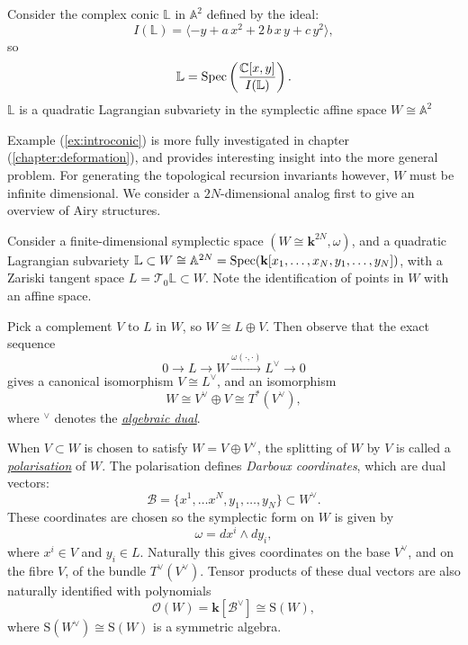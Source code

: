     
    
    \begin{ex} 
    \label{ex:introconic}
    Consider the complex conic \( \mathbb{L}\) in \( \mathbb{A}^2\) defined by the ideal:
    \[I(\mathbb{L})=\langle-y+a\,x^2+2\,b\,x\,y+c\,y^2\rangle,\]
    so
    \[ \mathbb{L}  = \mathrm{Spec}\left( \frac{\mathbb{C}[x,y]}{I(\mathbb{L})} \right).\] 
    \(\mathbb{L}\) is a quadratic Lagrangian subvariety in the symplectic affine space \(W \cong \mathbb{A}^2 \)
    \end{ex} 
    
    
    Example (\ref{ex:introconic}) is more fully investigated in chapter (\ref{chapter:deformation}), and provides interesting insight into the more general problem. For generating the topological recursion invariants however, \(W\) must be infinite dimensional. We consider a \(2N\)-dimensional analog first to give an overview of Airy structures.
    
    Consider a finite-dimensional symplectic space \((W\cong \mathbf{k}^{2N}, \omega ) \), and a quadratic Lagrangian subvariety \(\mathbb{L} \subset W \cong \mathbb{A}^{2N} = \mathrm{Spec}( \mathbf{k}[x_1, \dots ,x_N, y_1, \dots, y_N])\), with a Zariski tangent space \( L=\mathcal{T}_0\mathbb{L} \subset W \).  Note the identification of points in \(W\) with an affine space.
    
    Pick a complement \(V\) to \(L\) in \(W\), so
    \(W \cong L\oplus V.\)
    Then observe that the exact sequence 
    \[0 \rightarrow L\to W\stackrel{\omega(\cdot,\cdot)}{\to} L^{\vee} \rightarrow 0 \] 
    gives a canonical isomorphism \(V\cong L^{\vee}\), and an isomorphism 
    \[ W\cong V^{\vee}\oplus V \cong T^{*}(V^{\vee} ),\] 
    where \( {}^{\vee} \) denotes the \emph{\hyperref[defn:algdual]{algebraic dual}}. 
    
    When \(V\subset W\)  is chosen to satisfy \(W = V \oplus V^{\vee}\), the splitting of \(W\) by \(V\) is called a \emph{\hyperref[defn:polarisation]{polarisation}} of \(W\).  The polarisation defines \emph{Darboux coordinates}, which are dual vectors: 
    \[ \mathcal{B} =  \{x^1, \dots x^N,y_1, \dots, y_N\}   \subset W^{\vee}. \] 
    These coordinates are chosen so the symplectic form on \(W\) is given by 
    \[ \omega=dx^i\wedge dy_i,\] where \(x^i \in V\) and \( y_i \in L\).  Naturally this gives coordinates on the base \( V^{\vee}\), and on the fibre \(V\), of the bundle \(T^{\vee}(V^{\vee})\). Tensor products of these dual vectors are also naturally identified with polynomials
    \[ \mathcal{O}(W) = \mathbf{k}[\mathcal{B}^{\vee}] \cong \mathrm{S}(W),\]
    where \( \mathrm{S}(W^{\vee}) \cong \mathrm{S}(W)\) is a symmetric algebra.


